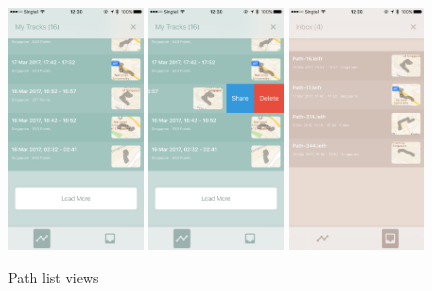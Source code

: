\documentclass[12pt,a4paper]{article}
\begin{document}
            \begin{figure}
                \includegraphics[width=0.32\textwidth]{4-1-5-a}
                \includegraphics[width=0.32\textwidth]{4-1-5-b}
                \includegraphics[width=0.32\textwidth]{4-1-5-c}
                \centering
                \caption{Path list views}
                \label{fig:path-lists}
            \end{figure}
            
\end{document}
